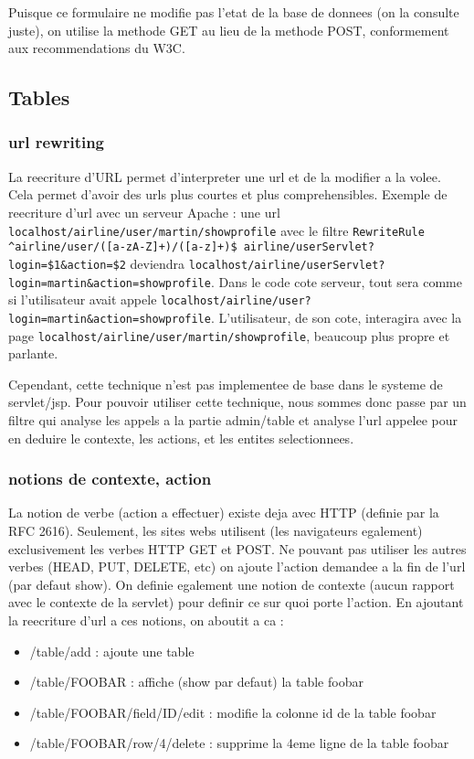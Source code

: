 Puisque ce formulaire ne modifie pas l'etat de la base de donnees (on la consulte juste), on utilise la methode GET au lieu de la methode POST, conformement aux recommendations du W3C.

\subsection{Tables}

\subsubsection{url rewriting}
La reecriture d'URL permet d'interpreter une url et de la modifier a la volee. Cela permet d'avoir des urls plus courtes et plus comprehensibles. Exemple de reecriture d'url avec un serveur Apache :
une url \verb|localhost/airline/user/martin/showprofile| avec le filtre \verb|RewriteRule ^airline/user/([a-zA-Z]+)/([a-z]+)$ airline/userServlet?login=$1&action=$2| deviendra \verb|localhost/airline/userServlet?login=martin&action=showprofile|. Dans le code cote serveur, tout sera comme si l'utilisateur avait appele \verb|localhost/airline/user?login=martin&action=showprofile|. L'utilisateur, de son cote, interagira avec la page \verb|localhost/airline/user/martin/showprofile|, beaucoup plus propre et parlante.

Cependant, cette technique n'est pas implementee de base dans le systeme de servlet/jsp. Pour pouvoir utiliser cette technique, nous sommes donc passe par un filtre qui analyse les appels a la partie admin/table et analyse l'url appelee pour en deduire le contexte, les actions, et les entites selectionnees.

\subsubsection{notions de contexte, action}
La notion de verbe (action a effectuer) existe deja avec HTTP (definie par la RFC 2616). Seulement, les sites webs utilisent (les navigateurs egalement) exclusivement les verbes HTTP GET et POST. Ne pouvant pas utiliser les autres verbes (HEAD, PUT, DELETE, etc) on ajoute l'action demandee a la fin de l'url (par defaut show). On definie egalement une notion de contexte (aucun rapport avec le contexte de la servlet) pour definir ce sur quoi porte l'action. En ajoutant la reecriture d'url a ces notions, on aboutit a ca :
\begin{itemize}
	\item{/table/add} : ajoute une table
	\item{/table/FOOBAR} : affiche (show par defaut) la table foobar
	\item{/table/FOOBAR/field/ID/edit} : modifie la colonne id de la table foobar
	\item{/table/FOOBAR/row/4/delete} :  supprime la 4eme ligne de la table foobar
\end{itemize}

